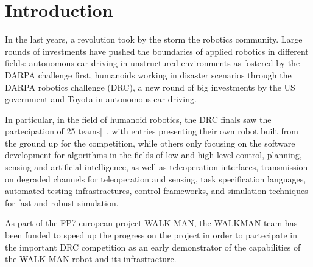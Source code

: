 \documentclass[%
	paper=A4,					%
	twoside=true,				%
	openright,			.
	parskip=full,				%
	chapterprefix=true,			%
	11pt,						%
	headings=normal,			%
	bibliography=totoc,			%
	listof=totoc,				%
	titlepage=on,				%
	captions=tableabove,		%
	draft=true,				%
]{scrreprt}%
\begin{document}

\pagestyle{empty}				%
\cleardoublepage

\pagestyle{plain}				%
\cleardoublepage
%
\setcounter{tocdepth}{2}		%
\tableofcontents				%
\cleardoublepage

\setcounter{page}{1}			%
\pagestyle{maincontentstyle} 	%

\chapter{Introduction}
In the last years, a revolution took by the storm the robotics community. Large rounds of investments have pushed the boundaries of applied robotics in different fields: autonomous car driving in unstructured environments as fostered by the DARPA challenge first, humanoids working in disaster scenarios through the DARPA robotics challenge (DRC), a new round of big investments by the US government and Toyota in autonomous car driving.

In particular, in the field of humanoid robotics,  the DRC finals saw the partecipation of 25 teams|~\cite{DRC-what-happened}, with entries presenting their own robot built from the ground up for the competition, while others only focusing on the software development for algorithms in the fields of low and high level control, planning, sensing and artificial intelligence, as well as teleoperation interfaces, transmission on degraded channels for teleoperation and sensing, task specification languages, automated testing infrastractures, control frameworks, and simulation techniques for fast and robust simulation.

As part of the FP7 european project WALK-MAN, the WALKMAN team has been funded to speed up the progress on the project in order to partecipate in the important DRC competition as an early demonstrator of the capabilities of the WALK-MAN robot and its infrastracture.
\end{document}
